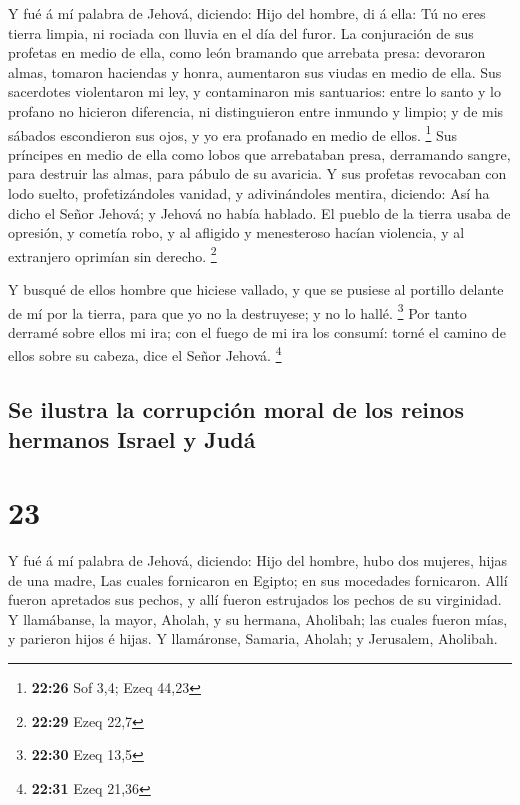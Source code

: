  Y fué á mí palabra de Jehová, diciendo: 
Hijo del hombre, di á ella: Tú no eres tierra limpia, ni rociada con
lluvia en el día del furor.  La conjuración de sus
profetas en medio de ella, como león bramando que arrebata presa:
devoraron almas, tomaron haciendas y honra, aumentaron sus viudas en
medio de ella.  Sus sacerdotes violentaron mi ley, y
contaminaron mis santuarios: entre lo santo y lo profano no hicieron
diferencia, ni distinguieron entre inmundo y limpio; y de mis sábados
escondieron sus ojos, y yo era profanado en medio de ellos. \footnote{\textbf{22:26}
  Sof 3,4; Ezeq 44,23}  Sus príncipes en medio de ella
como lobos que arrebataban presa, derramando sangre, para destruir las
almas, para pábulo de su avaricia.  Y sus profetas
revocaban con lodo suelto, profetizándoles vanidad, y adivinándoles
mentira, diciendo: Así ha dicho el Señor Jehová; y Jehová no había
hablado.  El pueblo de la tierra usaba de opresión, y
cometía robo, y al afligido y menesteroso hacían violencia, y al
extranjero oprimían sin derecho. \footnote{\textbf{22:29} Ezeq 22,7}

 Y busqué de ellos hombre que hiciese vallado, y que se
pusiese al portillo delante de mí por la tierra, para que yo no la
destruyese; y no lo hallé. \footnote{\textbf{22:30} Ezeq 13,5}
 Por tanto derramé sobre ellos mi ira; con el fuego de mi
ira los consumí: torné el camino de ellos sobre su cabeza, dice el Señor
Jehová. \footnote{\textbf{22:31} Ezeq 21,36}

\hypertarget{se-ilustra-la-corrupciuxf3n-moral-de-los-reinos-hermanos-israel-y-juduxe1}{%
\subsection{Se ilustra la corrupción moral de los reinos hermanos Israel
y
Judá}\label{se-ilustra-la-corrupciuxf3n-moral-de-los-reinos-hermanos-israel-y-juduxe1}}

\hypertarget{section-22}{%
\section{23}\label{section-22}}

 Y fué á mí palabra de Jehová, diciendo: 
Hijo del hombre, hubo dos mujeres, hijas de una madre, 
Las cuales fornicaron en Egipto; en sus mocedades fornicaron. Allí
fueron apretados sus pechos, y allí fueron estrujados los pechos de su
virginidad.  Y llamábanse, la mayor, Aholah, y su hermana,
Aholibah; las cuales fueron mías, y parieron hijos é hijas. Y
llamáronse, Samaria, Aholah; y Jerusalem, Aholibah.

